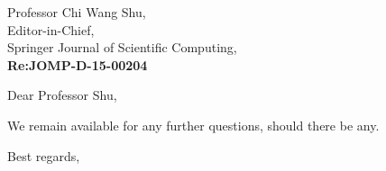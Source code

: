 \begin{letter}{Professor Chi Wang Shu, \\  Editor-in-Chief,\\
    Springer Journal of Scientific Computing,\\
\textbf{Re:JOMP-D-15-00204}}


\date{\today}

\opening{Dear Professor Shu,}
         \vspace{0.25cm}

%

%
%
\bigskip

We remain available for any further questions, should there be any.



\closing{Best regards, }

\end{letter}



